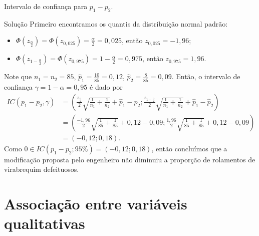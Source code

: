 \documentclass[9pt]{beamer}
\begin{document}
\begin{frame}{Intervalo de confiança para $p_1 - p_2$.}

\begin{block}{Solução}
Primeiro encontramos os quantis da distribuição normal padrão:
\begin{itemize}
\item $\Phi\left(z_\frac{\alpha}{2}\right) = \Phi\left(z_{0,025}\right) = \frac{\alpha}{2} = 0,025$, então $z_{0,025} =-1,96$;
\item $\Phi\left(z_{1-\frac{\alpha}{2}}\right) = \Phi\left(z_{0,975}\right) =1- \frac{\alpha}{2} = 0,975$, então $z_{0,975} =1,96$.
\end{itemize}	

Note que $n_1=n_2=85$, $\hat{p}_1 = \frac{10}{85} = 0,12$, $\hat{p}_2 = \frac{8}{85} = 0,09$. Então, o intervalo de confiança $\gamma=1-\alpha = 0,95$ é dado por
\begin{align*}
IC(p_1 - p_2, \gamma) &= \left( \frac{z_\frac{\alpha}{2}}{2} \sqrt{\frac{1}{n_1} + \frac{1}{n_2}} + \hat{p}_1 - \hat{p}_2; \frac{z_{1-\frac{\alpha}{2}}}{2} \sqrt{\frac{1}{n_1} + \frac{1}{n_2}} + \hat{p}_1 - \hat{p}_2  \right)\\
&= \left( \frac{-1,96}{2} \sqrt{\frac{1}{85} + \frac{1}{85}} + 0,12 - 0,09; \frac{1,96}{2} \sqrt{\frac{1}{85} + \frac{1}{85}} + 0,12 - 0,09 \right)\\
&= \left( -0,12; 0,18 \right).
\end{align*}
Como $0 \in 	IC(p_1 - p_2; 95\%)=(-0,12; 0,18)$, então concluímos que a modificação proposta pelo engenheiro não diminuiu a proporção de rolamentos de virabrequim defeituosos.
\end{block}

\end{frame}


\section{Associação entre variáveis qualitativas}
\end{document}
